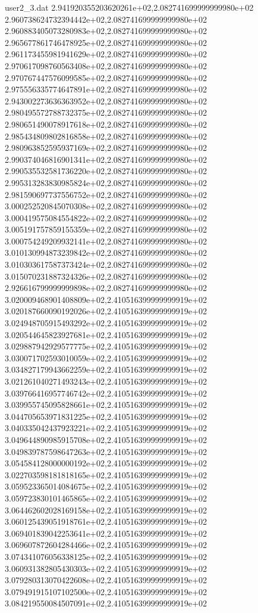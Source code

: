 \begin{filecontents}{user2_3.dat}
2.941920355203620261e+02,2.082741699999999980e+02
2.960738624732394442e+02,2.082741699999999980e+02
2.960883405073280983e+02,2.082741699999999980e+02
2.965677861746478925e+02,2.082741699999999980e+02
2.961173455981941629e+02,2.082741699999999980e+02
2.970617098760563408e+02,2.082741699999999980e+02
2.970767447576099585e+02,2.082741699999999980e+02
2.975556335774647891e+02,2.082741699999999980e+02
2.943002273636363952e+02,2.082741699999999980e+02
2.980495572788732375e+02,2.082741699999999980e+02
2.980651490078917618e+02,2.082741699999999980e+02
2.985434809802816858e+02,2.082741699999999980e+02
2.980963852595937169e+02,2.082741699999999980e+02
2.990374046816901341e+02,2.082741699999999980e+02
2.990535532581736220e+02,2.082741699999999980e+02
2.995313283830985824e+02,2.082741699999999980e+02
2.981590697737556752e+02,2.082741699999999980e+02
3.000252520845070308e+02,2.082741699999999980e+02
3.000419575084554822e+02,2.082741699999999980e+02
3.005191757859155359e+02,2.082741699999999980e+02
3.000754249209932141e+02,2.082741699999999980e+02
3.010130994873239842e+02,2.082741699999999980e+02
3.010303617587373424e+02,2.082741699999999980e+02
3.015070231887324326e+02,2.082741699999999980e+02
2.926616799999999898e+02,2.082741699999999980e+02
3.020009468901408809e+02,2.410516399999999919e+02
3.020187660090192026e+02,2.410516399999999919e+02
3.024948705915493292e+02,2.410516399999999919e+02
3.020544645823927681e+02,2.410516399999999919e+02
3.029887942929577775e+02,2.410516399999999919e+02
3.030071702593010059e+02,2.410516399999999919e+02
3.034827179943662259e+02,2.410516399999999919e+02
3.021261040271493243e+02,2.410516399999999919e+02
3.039766416957746742e+02,2.410516399999999919e+02
3.039955745095828661e+02,2.410516399999999919e+02
3.044705653971831225e+02,2.410516399999999919e+02
3.040335042437923221e+02,2.410516399999999919e+02
3.049644890985915708e+02,2.410516399999999919e+02
3.049839787598647263e+02,2.410516399999999919e+02
3.054584128000000192e+02,2.410516399999999919e+02
3.022703598181818165e+02,2.410516399999999919e+02
3.059523365014084675e+02,2.410516399999999919e+02
3.059723830101465865e+02,2.410516399999999919e+02
3.064462602028169158e+02,2.410516399999999919e+02
3.060125439051918761e+02,2.410516399999999919e+02
3.069401839042253641e+02,2.410516399999999919e+02
3.069607872604284466e+02,2.410516399999999919e+02
3.074341076056338125e+02,2.410516399999999919e+02
3.060931382805430303e+02,2.410516399999999919e+02
3.079280313070422608e+02,2.410516399999999919e+02
3.079491915107102500e+02,2.410516399999999919e+02
3.084219550084507091e+02,2.410516399999999919e+02

\end{filecontents}
